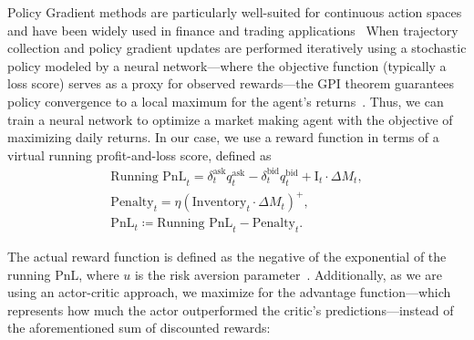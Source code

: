 \documentclass[11pt]{article}
\begin{document}
    Policy Gradient methods are particularly well-suited for continuous action spaces 
    and have been widely used in finance and trading applications~\citep{Guo2023, Gasperov2022}
    When trajectory collection and policy gradient updates are performed iteratively using a stochastic policy modeled 
    by a neural network---where the objective function (typically a loss score) serves as a proxy for observed rewards---the 
    GPI theorem guarantees policy convergence to a local maximum for the agent's returns~\citep{Sutton2018, Schulman2015}. 
    Thus, we can train a neural network to optimize a market making agent with the objective of maximizing daily returns.
    In our case, we use a reward function in terms of a virtual running profit-and-loss score, defined as
    \begin{equation}
        \begin{aligned}
            \text{Running PnL}_t = 
            \delta_t^{\text{ask}} q_t^{\text{ask}} 
            - \delta_t^{\text{bid}} q_t^{\text{bid}} 
            + \text{I}_t \cdot \Delta M_t, \\
            \text{Penalty}_t = \eta \left( \text{Inventory}_t \cdot \Delta M_t \right)^+,\\
            \text{PnL}_t \coloneqq \text{Running PnL}_t - \text{Penalty}_t .
        \end{aligned}
        \label{eq:pnl}
    \end{equation}

    The actual reward function is defined as the negative of the exponential of the running PnL, 
    where $u$ is the risk aversion parameter~\citep{Gueant2022, FalcesMarin2022}.
    Additionally, as we are using an actor-critic approach, 
    we maximize for the advantage function---which represents how much the actor
    outperformed the critic's predictions---instead of the aforementioned sum of discounted rewards:
    
\end{document}
